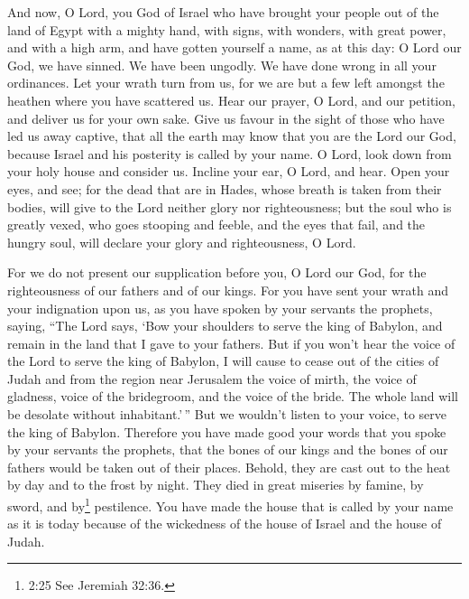  And now, O Lord, you God of Israel who have brought your
people out of the land of Egypt with a mighty hand, with signs, with
wonders, with great power, and with a high arm, and have gotten yourself
a name, as at this day:  O Lord our God, we have sinned. We
have been ungodly. We have done wrong in all your ordinances.
 Let your wrath turn from us, for we are but a few left
amongst the heathen where you have scattered us.  Hear our
prayer, O Lord, and our petition, and deliver us for your own sake. Give
us favour in the sight of those who have led us away captive,
 that all the earth may know that you are the Lord our God,
because Israel and his posterity is called by your name.  O
Lord, look down from your holy house and consider us. Incline your ear,
O Lord, and hear.  Open your eyes, and see; for the dead
that are in Hades, whose breath is taken from their bodies, will give to
the Lord neither glory nor righteousness;  but the soul who
is greatly vexed, who goes stooping and feeble, and the eyes that fail,
and the hungry soul, will declare your glory and righteousness, O Lord.

 For we do not present our supplication before you, O Lord
our God, for the righteousness of our fathers and of our kings.
 For you have sent your wrath and your indignation upon us,
as you have spoken by your servants the prophets, saying, 
``The Lord says, `Bow your shoulders to serve the king of Babylon, and
remain in the land that I gave to your fathers.  But if you
won't hear the voice of the Lord to serve the king of Babylon,
 I will cause to cease out of the cities of Judah and from
the region near Jerusalem the voice of mirth, the voice of gladness,
voice of the bridegroom, and the voice of the bride. The whole land will
be desolate without inhabitant.'\,''  But we wouldn't
listen to your voice, to serve the king of Babylon. Therefore you have
made good your words that you spoke by your servants the prophets, that
the bones of our kings and the bones of our fathers would be taken out
of their places.  Behold, they are cast out to the heat by
day and to the frost by night. They died in great miseries by famine, by
sword, and by\footnote{2:25 See Jeremiah 32:36.} pestilence.
 You have made the house that is called by your name as it
is today because of the wickedness of the house of Israel and the house
of Judah.

